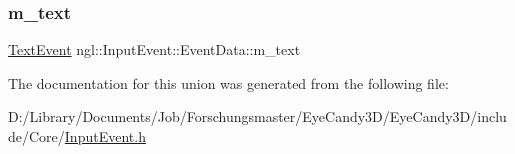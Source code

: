 \mbox{\label{unionngl_1_1_input_event_1_1_event_data_a9d017fa783cffef51da5896260496007}} 
\subsubsection{\texorpdfstring{m\+\_\+text}{m\_text}}
{\footnotesize\ttfamily \mbox{\hyperlink{structngl_1_1_text_event}{Text\+Event}} ngl\+::\+Input\+Event\+::\+Event\+Data\+::m\+\_\+text}



The documentation for this union was generated from the following file\+:\begin{DoxyCompactItemize}
\item 
D\+:/\+Library/\+Documents/\+Job/\+Forschungsmaster/\+Eye\+Candy3\+D/\+Eye\+Candy3\+D/include/\+Core/\mbox{\hyperlink{_input_event_8h}{Input\+Event.\+h}}\end{DoxyCompactItemize}
